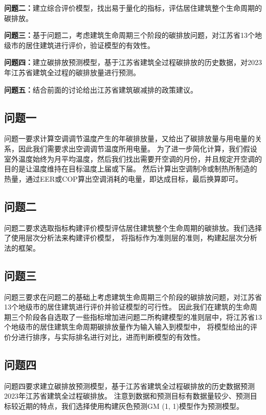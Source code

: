 \documentclass[a4paper, 12pt]{article}
\numberwithin{equation}{section}
\begin{document}
            \textbf{问题二：}建立综合评价模型，找出易于量化的指标，评估居住建筑整个生命周期的碳排放。

            \textbf{问题三：}基于问题二，考虑建筑生命周期三个阶段的碳排放问题，对江苏省13个地级市的居住建筑进行评价，验证模型的有效性。

            \textbf{问题四：}建立碳排放预测模型，基于江苏省建筑全过程碳排放的历史数据，对2023年江苏省建筑全过程的碳排放量进行预测。

            \textbf{问题五：}结合前面的讨论给出江苏省建筑碳减排的政策建议。


    {}
        \subsection{问题一}
            问题一要求计算空调调节温度产生的年碳排放量，又给出了碳排放量与用电量的关系，因此我们需要求出空调调节温度所用电量。
            为了进一步简化计算，我们假设室外温度始终为月平均温度，然后我们找出需要开空调的月份，并且规定开空调的目的是让温度维持在目标温度上届或下届。
            然后计算出空调制冷或制热所制造的热量，通过EER或COP算出空调消耗的电量，即达成目标，最后换算即可。

        \subsection{问题二}
            问题二要求选取指标构建评价模型评估居住建筑整个生命周期的碳排放。我们选择了使用层次分析法来构建评价模型，
            将指标作为准则层的准则，构建起层次分析法的框架。

        \subsection{问题三}
            问题三要求在问题二的基础上考虑建筑生命周期三个阶段的碳排放问题，对江苏省13个地级市的居住建筑进行评价并验证模型的可行性。
            因此我们在建筑的生命周期三个阶段各自选取了一些指标增加进问题二所构建模型的准则层中，将江苏省13个地级市的居住建筑生命周期碳排放量作为输入输入到模型中，
            将模型给出的评价分进行排序，与实际排名进行对比，进而判断模型的有效性。

        \subsection{问题四}
            问题四要求建立碳排放预测模型，基于江苏省建筑全过程碳排放的历史数据预测2023年江苏省建筑全过程碳排放。
            注意到数据和预测目标有数据量较少、预测目标较近期的特点，我们选择使用构建灰色预测GM (1, 1)模型作为预测模型。
\end{document}
